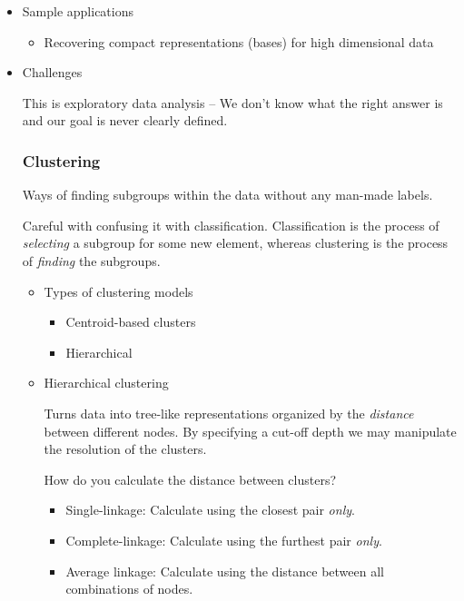 \documentclass[11pt]{article}
\begin{document}
\begin{itemize}
\item Sample applications
\label{sec-2-2-0-1}

\begin{itemize}
\item Recovering compact representations (bases) for high dimensional data
\end{itemize}

\item Challenges
\label{sec-2-2-0-2}

This is exploratory data analysis -- We don't know what the right answer is and our goal is never clearly defined.

\subsubsection*{Clustering}
\label{sec-2-2-1}

Ways of finding subgroups within the data without any man-made labels.

Careful with confusing it with classification. Classification is the process of \emph{selecting} a subgroup for some new element, whereas clustering is the process of \emph{finding} the subgroups.

\begin{itemize}
\item Types of clustering models
\label{sec-2-2-1-1}

\begin{itemize}
\item Centroid-based clusters
\item Hierarchical
\end{itemize}

\item Hierarchical clustering
\label{sec-2-2-1-2}

Turns data into tree-like representations organized by the \emph{distance} between different nodes. By specifying a cut-off depth we may manipulate the resolution of the clusters.

How do you calculate the distance between clusters?
\begin{itemize}
\item Single-linkage: Calculate using the closest pair \emph{only}.
\item Complete-linkage: Calculate using the furthest pair \emph{only}.
\item Average linkage: Calculate using the distance between all combinations of nodes.
\end{itemize}


\end{itemize}
\end{itemize}
\end{document}
